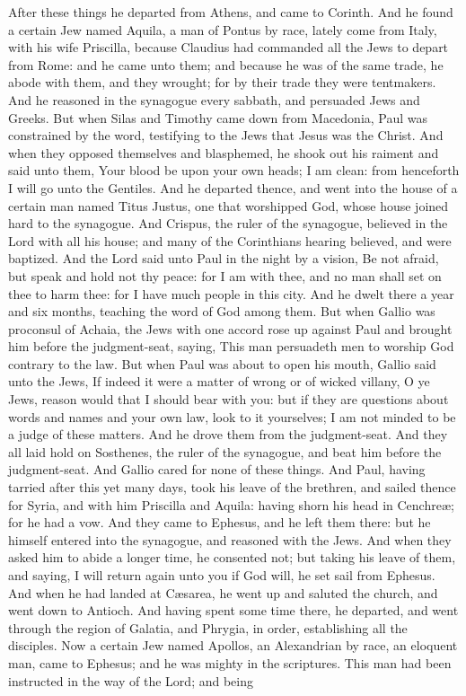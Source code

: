 After these things he departed from Athens, and came to Corinth. And he found a certain Jew named Aquila, a man of Pontus by race, lately come from Italy, with his wife Priscilla, because Claudius had commanded all the Jews to depart from Rome: and he came unto them; and because he was of the same trade, he abode with them, and they wrought; for by their trade they were tentmakers. And he reasoned in the synagogue every sabbath, and persuaded Jews and Greeks.  But when Silas and Timothy came down from Macedonia, Paul was constrained by the word, testifying to the Jews that Jesus was the Christ. And when they opposed themselves and blasphemed, he shook out his raiment and said unto them, Your blood be upon your own heads; I am clean: from henceforth I will go unto the Gentiles. And he departed thence, and went into the house of a certain man named Titus Justus, one that worshipped God, whose house joined hard to the synagogue. And Crispus, the ruler of the synagogue, believed in the Lord with all his house; and many of the Corinthians hearing believed, and were baptized. And the Lord said unto Paul in the night by a vision, Be not afraid, but speak and hold not thy peace: for I am with thee, and no man shall set on thee to harm thee: for I have much people in this city. And he dwelt there a year and six months, teaching the word of God among them.  But when Gallio was proconsul of Achaia, the Jews with one accord rose up against Paul and brought him before the judgment-seat, saying, This man persuadeth men to worship God contrary to the law. But when Paul was about to open his mouth, Gallio said unto the Jews, If indeed it were a matter of wrong or of wicked villany, O ye Jews, reason would that I should bear with you: but if they are questions about words and names and your own law, look to it yourselves; I am not minded to be a judge of these matters. And he drove them from the judgment-seat. And they all laid hold on Sosthenes, the ruler of the synagogue, and beat him before the judgment-seat. And Gallio cared for none of these things.  And Paul, having tarried after this yet many days, took his leave of the brethren, and sailed thence for Syria, and with him Priscilla and Aquila: having shorn his head in Cenchreæ; for he had a vow. And they came to Ephesus, and he left them there: but he himself entered into the synagogue, and reasoned with the Jews. And when they asked him to abide a longer time, he consented not; but taking his leave of them, and saying, I will return again unto you if God will, he set sail from Ephesus.  And when he had landed at Cæsarea, he went up and saluted the church, and went down to Antioch. And having spent some time there, he departed, and went through the region of Galatia, and Phrygia, in order, establishing all the disciples.  Now a certain Jew named Apollos, an Alexandrian by race, an eloquent man, came to Ephesus; and he was mighty in the scriptures. This man had been instructed in the way of the Lord; and being 